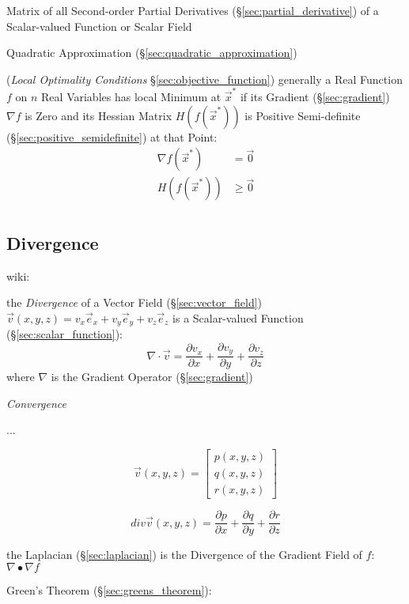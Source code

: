 Matrix of all Second-order Partial Derivatives (\S\ref{sec:partial_derivative})
of a Scalar-valued Function or Scalar Field

\fist Quadratic Approximation (\S\ref{sec:quadratic_approximation})

(\emph{Local Optimality Conditions} \S\ref{sec:objective_function}) generally a
Real Function $f$ on $n$ Real Variables has local Minimum at $\vec{x}^*$ if its
Gradient (\S\ref{sec:gradient}) $\nabla f$ is Zero and its Hessian Matrix
$H(f(\vec{x}^*))$ is Positive Semi-definite (\S\ref{sec:positive_semidefinite})
at that Point:
\begin{align*}
  \nabla f(\vec{x}^*) & = \vec{0}    \\
  H(f(\vec{x}^*))     & \geq \vec{0} \\
\end{align*}



\subsection{Divergence}\label{sec:divergence}

wiki:

the \emph{Divergence} of a Vector Field (\S\ref{sec:vector_field})
$\vec{v}(x,y,z) = v_x\vec{e}_x + v_y\vec{e}_y + v_z\vec{e}_z$ is a
Scalar-valued Function (\S\ref{sec:scalar_function}):
\[
  \nabla \cdot \vec{v} =
    \frac{\partial v_x}{\partial x} +
    \frac{\partial v_y}{\partial y} +
    \frac{\partial v_z}{\partial z}
\]
where $\nabla$ is the Gradient Operator (\S\ref{sec:gradient})

\emph{Convergence}

...

\[
  \vec{v}(x,y,z) = \begin{bmatrix}
    p(x,y,z) \\
    q(x,y,z) \\
    r(x,y,z)
  \end{bmatrix}
\]

\[
  div\vec{v}(x,y,z)
    = \frac{\partial{p}}{\partial{x}}
    + \frac{\partial{q}}{\partial{y}}
    + \frac{\partial{r}}{\partial{z}}
\]

the Laplacian (\S\ref{sec:laplacian}) is the Divergence of the Gradient Field
of $f$: $\nabla \bullet \nabla f$

Green's Theorem (\S\ref{sec:greens_theorem}):

